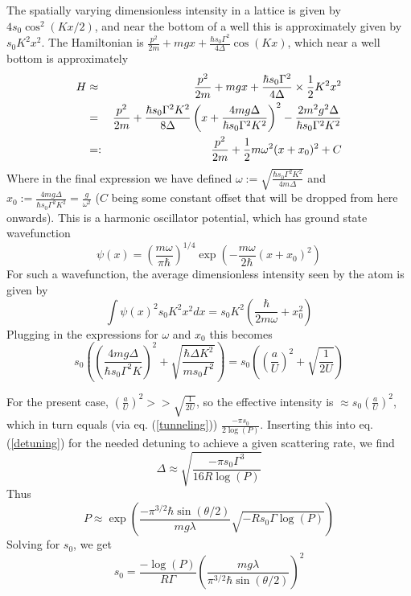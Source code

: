 \documentclass[aps,twocolumn,prb,floatfix,amsmath,amssymb,groupedaddress]{revtex4}
\begin{document}
The spatially varying dimensionless intensity in a lattice is given by $4 s_0 \cos^2(Kx/2)$, and near the bottom of a well this is approximately given by $s_0K^2x^2$.  The Hamiltonian is $\frac{p^2}{2m} + mgx + \frac{\hbar s_0 \Gamma^2}{4\Delta}\cos(Kx)$, which near a well bottom is approximately 
\begin{eqnarray*}
H & \approx & \frac{p^2}{2m} + mgx + \frac{\hbar s_0 \Gamma^2}{4\Delta} \times{\frac{1}{2}} K^2x^2 \\
& = & \frac{p^2}{2m} + \frac{\hbar s_0\Gamma^2 K^2}{8\Delta} \left(x + \frac{4mg\Delta}{\hbar s_0\Gamma^2K^2}\right)^2 - \frac{2m^2g^2\Delta}{\hbar s_0 \Gamma^2 K^2} \\
& =: & \frac{p^2}{2m} + {\frac{1}{2}} m\omega^2 (x+x_0)^2 + C
\end{eqnarray*}
Where in the final expression we have defined $\omega := \sqrt{\frac{\hbar s_0 \Gamma^2 K^2}{4m\Delta}}$ and $x_0 := \frac{4mg\Delta}{\hbar s_0 \Gamma^2 K^2} = \frac{g}{\omega^2}$ ($C$ being some constant offset that will be dropped from here onwards).  This is a harmonic oscillator potential, which has ground state wavefunction
\begin{equation*}
\psi(x) = \left(\frac{m\omega}{\pi\hbar}\right)^{1/4}\exp\left(- \frac{m\omega}{2\hbar}\left(x+x_0\right)^2\right)
\end{equation*}
For such a wavefunction, the average dimensionless intensity seen by the atom is given by 
\[\int \psi(x)^2 s_0 K^2 x^2 dx = s_0 K^2 \left(\frac{\hbar}{2m\omega} + x_0^2\right)\]
Plugging in the expressions for $\omega$ and $x_0$ this becomes
\[ s_0 \left( \left(\frac{4mg\Delta}{\hbar s_0\Gamma^2 K}\right)^2 + \sqrt{\frac{\hbar\Delta K^2}{ms_0\Gamma^2}}\right) = s_0 \left( \left(\frac{a}{U}\right)^2 + \sqrt{\frac{1}{2U}}\right)\]

For the present case, $\left(\frac{a}{U}\right)^2 >> \sqrt{\frac{1}{2U}}$, so the effective intensity is $\approx s_0 \left(\frac{a}{U}\right)^2$, which in turn equals (via eq. (\ref{tunneling})) $\frac{-\pi s_0}{2\log(P)}$.  Inserting this into eq. (\ref{detuning}) for the needed detuning to achieve a given scattering rate, we find
\[\Delta\approx \sqrt{\frac{-\pi s_0\Gamma^3}{16R\log(P)}}\]
Thus 
\[P\approx\exp\left(\frac{-\pi^{3/2}\hbar\sin(\theta/2)}{mg\lambda}\sqrt{-Rs_0\Gamma \log(P)}\right) \]
Solving for $s_0$, we get
\begin{equation}
s_0 = \frac{-\log(P)}{R\Gamma} \left(\frac{mg\lambda}{\pi^{3/2}\hbar \sin(\theta/2)}\right)^2
\end{equation}
\end{document}
